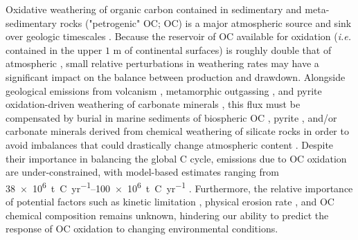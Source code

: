 Oxidative weathering of organic carbon contained in sedimentary and meta-sedimentary rocks ("petrogenic" OC; OC) is a major atmospheric  source and  sink over geologic timescales \citep[\SI{\geq e6}{yr};][]{Berner:1989vr,Wildman:2004wf,Hayes:2006ca,Petsch:2014ct}. Because the reservoir of OC available for oxidation (\textit{i.e.} contained in the upper $1$ m of continental surfaces) is roughly double that of atmospheric  \citep{Copard:2007bf}, small relative perturbations in weathering rates may have a significant impact on the balance between  production and drawdown. Alongside geological  emissions from volcanism \citep{Marty:1998vo}, metamorphic outgassing \citep{Becker:2008bd}, and pyrite oxidation-driven weathering of carbonate minerals \citep{Torres:2014cx}, this flux must be compensated by burial in marine sediments of biospheric OC \citep[OC;][]{FranceLanord:1997ua,Galy:2007ev,Hilton:2008fo}, pyrite \citep{Berner:1989vr,Hayes:2006ca}, and/or carbonate minerals derived from chemical weathering of silicate rocks \citep{Berner:1989vr} in order to avoid imbalances that could drastically change atmospheric  content \citep{Berner:1997df}. Despite their importance in balancing the global C cycle,  emissions due to OC oxidation are under-constrained, with model-based estimates ranging from \SIrange{38e6}{100e6}{t.C.yr^{-1}} \citep{Petsch:2014ct}. Furthermore, the relative importance of potential factors such as kinetic limitation \citep{Chang:1999vo,Petsch:2001eq}, physical erosion rate \citep{Hilton:2014dh}, and OC chemical composition \citep{Galy:2008ff} remains unknown, hindering our ability to predict the response of OC oxidation to changing environmental conditions.


